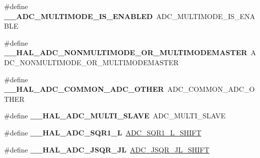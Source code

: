\begin{DoxyCompactItemize}
\item 
\hypertarget{group___h_a_l___a_d_c___aliased___macros_gaa5b9fcac48711d597023aecdb11afc51}{\#define {\bfseries \-\_\-\-\_\-\-A\-D\-C\-\_\-\-M\-U\-L\-T\-I\-M\-O\-D\-E\-\_\-\-I\-S\-\_\-\-E\-N\-A\-B\-L\-E\-D}~A\-D\-C\-\_\-\-M\-U\-L\-T\-I\-M\-O\-D\-E\-\_\-\-I\-S\-\_\-\-E\-N\-A\-B\-L\-E}\label{group___h_a_l___a_d_c___aliased___macros_gaa5b9fcac48711d597023aecdb11afc51}

\item 
\hypertarget{group___h_a_l___a_d_c___aliased___macros_ga3dceabcf80e81b5a911bbe5ad3ff311a}{\#define {\bfseries \-\_\-\-\_\-\-H\-A\-L\-\_\-\-A\-D\-C\-\_\-\-N\-O\-N\-M\-U\-L\-T\-I\-M\-O\-D\-E\-\_\-\-O\-R\-\_\-\-M\-U\-L\-T\-I\-M\-O\-D\-E\-M\-A\-S\-T\-E\-R}~A\-D\-C\-\_\-\-N\-O\-N\-M\-U\-L\-T\-I\-M\-O\-D\-E\-\_\-\-O\-R\-\_\-\-M\-U\-L\-T\-I\-M\-O\-D\-E\-M\-A\-S\-T\-E\-R}\label{group___h_a_l___a_d_c___aliased___macros_ga3dceabcf80e81b5a911bbe5ad3ff311a}

\item 
\hypertarget{group___h_a_l___a_d_c___aliased___macros_gafa9bcc01aa0b2a887721e8971031ad0b}{\#define {\bfseries \-\_\-\-\_\-\-H\-A\-L\-\_\-\-A\-D\-C\-\_\-\-C\-O\-M\-M\-O\-N\-\_\-\-A\-D\-C\-\_\-\-O\-T\-H\-E\-R}~A\-D\-C\-\_\-\-C\-O\-M\-M\-O\-N\-\_\-\-A\-D\-C\-\_\-\-O\-T\-H\-E\-R}\label{group___h_a_l___a_d_c___aliased___macros_gafa9bcc01aa0b2a887721e8971031ad0b}

\item 
\hypertarget{group___h_a_l___a_d_c___aliased___macros_gaeff1a570027a91c87a339fd79704c3d2}{\#define {\bfseries \-\_\-\-\_\-\-H\-A\-L\-\_\-\-A\-D\-C\-\_\-\-M\-U\-L\-T\-I\-\_\-\-S\-L\-A\-V\-E}~A\-D\-C\-\_\-\-M\-U\-L\-T\-I\-\_\-\-S\-L\-A\-V\-E}\label{group___h_a_l___a_d_c___aliased___macros_gaeff1a570027a91c87a339fd79704c3d2}

\item 
\hypertarget{group___h_a_l___a_d_c___aliased___macros_ga27072f37b7d50adad434a681331755f0}{\#define {\bfseries \-\_\-\-\_\-\-H\-A\-L\-\_\-\-A\-D\-C\-\_\-\-S\-Q\-R1\-\_\-\-L}~\hyperlink{group___a_d_c___private___macros_ga2b29c0e46fa4205f77b15fe7c3425fb8}{A\-D\-C\-\_\-\-S\-Q\-R1\-\_\-\-L\-\_\-\-S\-H\-I\-F\-T}}\label{group___h_a_l___a_d_c___aliased___macros_ga27072f37b7d50adad434a681331755f0}

\item 
\hypertarget{group___h_a_l___a_d_c___aliased___macros_ga8764a28e2bb7d6a859fc52074e2ec1ec}{\#define {\bfseries \-\_\-\-\_\-\-H\-A\-L\-\_\-\-A\-D\-C\-\_\-\-J\-S\-Q\-R\-\_\-\-J\-L}~\hyperlink{group___a_d_c___private___macros_gafac7dc7cf0679da43a697df5ca1b79fd}{A\-D\-C\-\_\-\-J\-S\-Q\-R\-\_\-\-J\-L\-\_\-\-S\-H\-I\-F\-T}}\label{group___h_a_l___a_d_c___aliased___macros_ga8764a28e2bb7d6a859fc52074e2ec1ec}


\end{DoxyCompactItemize}
